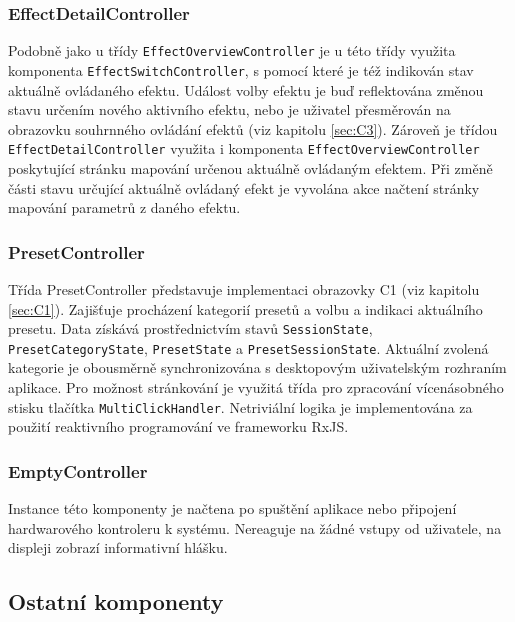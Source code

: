 \documentclass[thesis=M,czech]{FITthesis}[2019/03/06]
\begin{document}
			\subsubsection{EffectDetailController}
				Podobně jako u třídy \texttt{Effect\-Overview\-Controller} je u této třídy využita komponenta \texttt{Effect\-Switch\-Controller},
				s pomocí které je též indikován stav aktuálně ovládaného efektu. Událost volby efektu je buď 
				reflektována změnou stavu určením nového aktivního efektu, nebo je uživatel přesměrován na obrazovku souhrnného ovládání efektů (viz kapitolu \ref{sec:C3}).
				Zároveň je třídou \texttt{Effect\-Detail\-Controller} využita i komponenta \texttt{Effect\-Overview\-Controller} poskytující
				stránku mapování určenou aktuálně ovládaným efektem. Při změně části stavu určující aktuálně ovládaný efekt
				je vyvolána akce načtení stránky mapování parametrů z daného efektu.
		
			\subsubsection{PresetController}
				Třída PresetController představuje implementaci obrazovky C1 (viz kapitolu \ref{sec:C1}). 
				Zajišťuje procházení kategorií presetů a volbu a indikaci aktuálního presetu.
				Data získává prostřednictvím stavů \texttt{SessionState}, \texttt{Preset\-Category\-State}, \texttt{PresetState} a \texttt{Preset\-Session\-State}.
				Aktuální zvolená kategorie je obousměrně synchronizována s desktopovým uživatelským rozhraním aplikace.
				Pro možnost stránkování je využitá třída pro zpracování vícenásobného stisku tlačítka \texttt{Multi\-Click\-Handler}.
				Netriviální logika je implementována za použití reaktivního programování ve frameworku RxJS.
		
			\subsubsection{EmptyController}
				Instance této komponenty je načtena po spuštění aplikace nebo připojení hardwarového kontroleru k systému. Nereaguje na žádné vstupy od uživatele, na displeji zobrazí informativní hlášku.
						
		
		\subsection{Ostatní komponenty}
\end{document}
